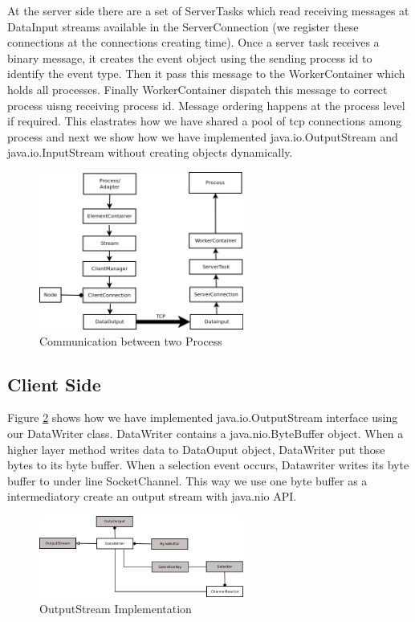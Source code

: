 At the server side there are a set of ServerTasks which read receiving messages at DataInput streams available in the ServerConnection (we register these connections at the connections creating time). Once a server task receives a binary message, it creates the event object using the sending process id to identify the event type. Then it pass this message to the WorkerContainer which holds all processes. Finally WorkerContainer dispatch this message to correct process uisng receiving process id. Message ordering happens at the process level if required. This elastrates how we have shared a pool of tcp connections among process and next we show how we have implemented java.io.OutputStream and java.io.InputStream without creating objects dynamically. 
\begin{figure}
        \centering
        \includegraphics[width=0.6\textwidth]{interprocess.png}
        \caption{Communication between two Process}
        \label{interprocess}
\end{figure}
\subsection{Client Side}
Figure \ref{client} shows how we have implemented java.io.OutputStream interface using our DataWriter class. DataWriter contains a java.nio.ByteBuffer object. When a higher layer method writes data to DataOuput object, DataWriter put those bytes to its byte buffer. When a selection event occurs, Datawriter writes its byte buffer to under line SocketChannel. This way we use one byte buffer as a intermediatory create an output stream with java.nio API.
\begin{figure}
        \centering
        \includegraphics[width=0.6\textwidth]{client.png}
        \caption{OutputStream Implementation}
        \label{client}
\end{figure}
